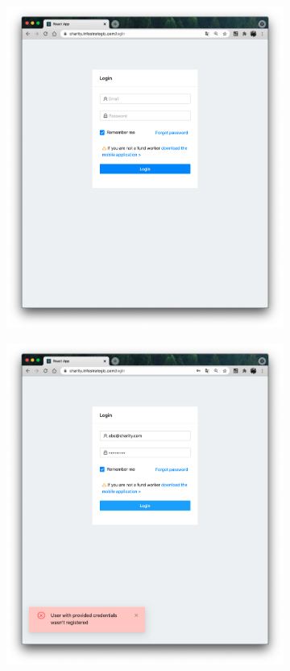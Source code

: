 \documentclass[a4paper,12pt,reqno]{article}
\begin{document}
	\begin{figure}[H]
		\centering
		\begin{subfigure}[b]{0.475\linewidth}
			\includegraphics[width=\linewidth]{img/ro/login.png}
		\end{subfigure}
		\begin{subfigure}[b]{0.475\linewidth}
			\includegraphics[width=\linewidth]{img/ro/login_error.png}

\end{subfigure}
\end{figure}
\end{document}
